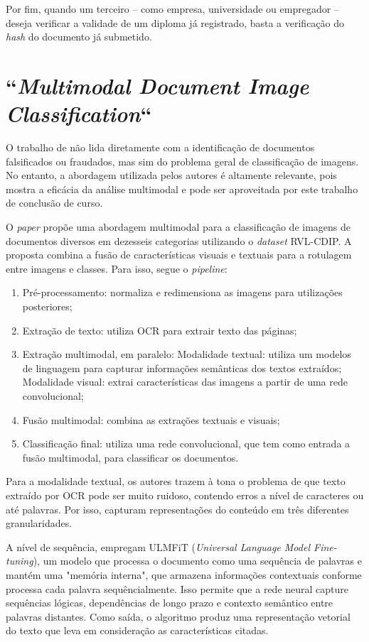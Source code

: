 Por fim, quando um terceiro -- como empresa, universidade ou empregador -- deseja verificar a validade de um diploma já registrado, basta a verificação do \textit{hash} do documento já submetido.

\section{``\protect\textit{Multimodal Document Image Classification}``}

O trabalho de \citeauthor*{multimodal} \cite*{multimodal} não lida diretamente com a identificação de documentos falsificados ou fraudados, mas sim do problema geral de classificação de imagens. No entanto, a abordagem utilizada pelos autores é altamente relevante, pois mostra a eficácia da análise multimodal e pode ser aproveitada por este trabalho de conclusão de curso.

O \textit{paper} propõe uma abordagem multimodal para a classificação de imagens de documentos diversos em dezesseis categorias utilizando o \textit{dataset} RVL-CDIP. A proposta combina a fusão de características visuais e textuais para a rotulagem entre imagens e classes. Para isso, segue o \textit{pipeline}:

\begin{enumerate}
    \item Pré-processamento: normaliza e redimensiona as imagens para utilizações posteriores;
    \item Extração de texto: utiliza OCR para extrair texto das páginas;
    \item Extração multimodal, em paralelo:
    \subitem Modalidade textual: utiliza um modelos de linguagem para capturar informações semânticas dos textos extraídos;
    \subitem Modalidade visual: extrai características das imagens a partir de uma rede convolucional;
    \item Fusão multimodal: combina as extrações textuais e visuais;
    \item Classificação final: utiliza uma rede convolucional, que tem como entrada a fusão multimodal, para classificar os documentos.
\end{enumerate}

Para a modalidade textual, os autores trazem à tona o problema de que texto extraído por OCR pode ser muito ruidoso, contendo erros a nível de caracteres ou até palavras. Por isso, capturam representações do conteúdo em três diferentes granularidades. 

A nível de sequência, empregam ULMFiT (\textit{Universal Language Model Fine-tuning}), um modelo que processa o documento como uma sequência de palavras e mantém uma "memória interna", que armazena informações contextuais conforme processa cada palavra sequêncialmente. Isso permite que a rede neural capture sequências lógicas, dependências de longo prazo e contexto semântico entre palavras distantes. Como saída, o algoritmo produz uma representação vetorial do texto que leva em consideração as características citadas.

